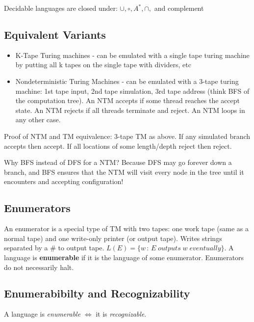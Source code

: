Decidable languages are closed under: $\cup, \circ, A^*, \cap,$ and complement

\subsection{Equivalent Variants}
\label{equivalentvariants}

\begin{itemize}
\item K-{}Tape Turing machines -{} can be emulated with a single tape turing machine by putting all k tapes on the single tape with dividers, etc

\item Nondeterministic Turing Machines -{} can be emulated with a 3-{}tape turing machine: 1st tape input, 2nd tape simulation, 3rd tape address (think BFS of the computation tree). An NTM accepts if some thread reaches the accept state. An NTM rejects if all threads terminate and reject. An NTM loops in any other case.

\end{itemize}

Proof of NTM and TM equivalence: 3-{}tape TM as above. If any simulated branch accepts then accept. If all locations of some length\slash depth reject then reject.

Why BFS instead of DFS for a NTM? Because DFS may go forever down a branch, and BFS ensures that the NTM will visit every node in the tree until it encounters and accepting configuration!

\subsection{Enumerators}
\label{enumerators}

An enumerator is a special type of TM with two tapes: one work tape (same as a normal tape) and one write-{}only printer (or output tape). Writes strings separated by a \# to output tape. $L(E) = \{w\, :\, E\; outputs\; w\; eventually\}$. A language is \textbf{enumerable} if it is the language of some enumerator. Enumerators do not necessarily halt.

\subsection{Enumerabibilty and Recognizability}
\label{enumerabibiltyandrecognizability}

A language is \emph{enumerable} $\Leftrightarrow$ it is \emph{recognizable}.

